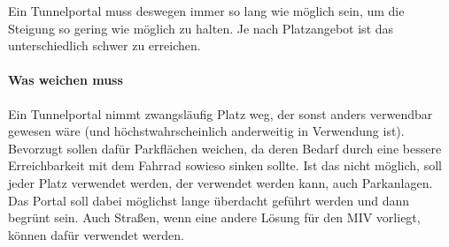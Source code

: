 Ein Tunnelportal muss deswegen immer so lang wie möglich sein, um die Steigung so gering wie möglich zu halten. Je nach Platzangebot ist das unterschiedlich schwer zu erreichen.

\paragraph{Was weichen muss}
Ein Tunnelportal nimmt zwangsläufig Platz weg, der sonst anders verwendbar gewesen wäre (und höchstwahrscheinlich anderweitig in Verwendung ist). Bevorzugt sollen dafür Parkflächen weichen, da deren Bedarf durch eine bessere Erreichbarkeit mit dem Fahrrad sowieso sinken sollte. Ist das nicht möglich, soll jeder Platz verwendet werden, der verwendet werden kann, auch Parkanlagen. Das Portal soll dabei möglichst lange überdacht geführt werden und dann begrünt sein. Auch Straßen, wenn eine andere Lösung für den MIV vorliegt, können dafür verwendet werden.



